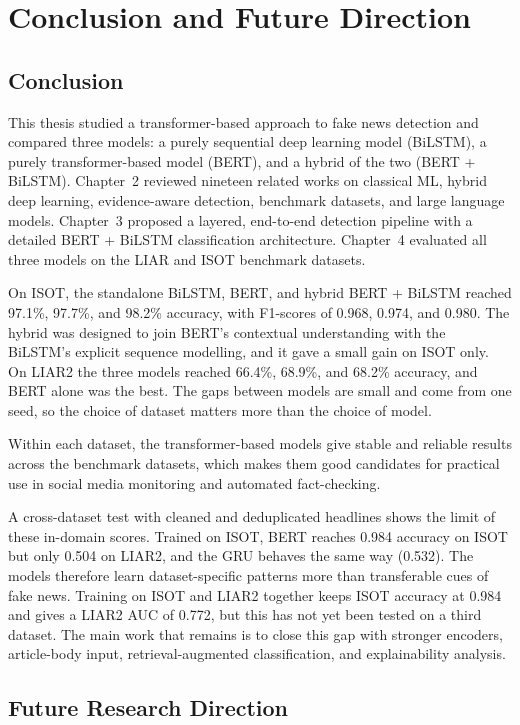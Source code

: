 \sloppy
\chapter{Conclusion and Future Direction}

\section{Conclusion}

This thesis studied a transformer-based approach to fake news detection and compared three models: a purely sequential deep learning model (BiLSTM), a purely transformer-based model (BERT), and a hybrid of the two (BERT + BiLSTM). Chapter~2 reviewed nineteen related works on classical ML, hybrid deep learning, evidence-aware detection, benchmark datasets, and large language models. Chapter~3 proposed a layered, end-to-end detection pipeline with a detailed BERT + BiLSTM classification architecture. Chapter~4 evaluated all three models on the LIAR and ISOT benchmark datasets.

On ISOT, the standalone BiLSTM, BERT, and hybrid BERT + BiLSTM reached 97.1\%, 97.7\%, and 98.2\% accuracy, with F1-scores of 0.968, 0.974, and 0.980. The hybrid was designed to join BERT's contextual understanding with the BiLSTM's explicit sequence modelling, and it gave a small gain on ISOT only. On LIAR2 the three models reached 66.4\%, 68.9\%, and 68.2\% accuracy, and BERT alone was the best. The gaps between models are small and come from one seed, so the choice of dataset matters more than the choice of model.

Within each dataset, the transformer-based models give stable and reliable results across the benchmark datasets, which makes them good candidates for practical use in social media monitoring and automated fact-checking.

A cross-dataset test with cleaned and deduplicated headlines shows the limit of these in-domain scores. Trained on ISOT, BERT reaches 0.984 accuracy on ISOT but only 0.504 on LIAR2, and the GRU behaves the same way (0.532). The models therefore learn dataset-specific patterns more than transferable cues of fake news. Training on ISOT and LIAR2 together keeps ISOT accuracy at 0.984 and gives a LIAR2 AUC of 0.772, but this has not yet been tested on a third dataset. The main work that remains is to close this gap with stronger encoders, article-body input, retrieval-augmented classification, and explainability analysis.

\section{Future Research Direction}

